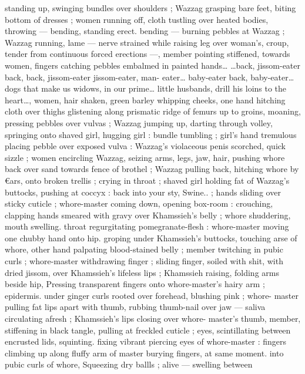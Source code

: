 standing up, swinging bundles over shoulders ; Wazzag grasping 
bare feet, biting bottom of dresses ; women running off, cloth 
tustling over heated bodies, throwing --- bending, standing erect. 
bending --- burning pebbles at Wazzag ; Wazzag running, lame --- 
nerve strained while raising leg over woman's, croup, tender from 
continuous forced erections ---, member pointing stiffened, towards 
women, fingers catching pebbles embalmed in painted hands{\ldots} 
{\gl}{\ldots}back, jissom-eater{\td} back, back, jissom-eater{\td} jissom-eater, man- 
eater{\ldots} baby-eater{\td} back, baby-eater{\ldots} dogs that make us widows, in 
our prime{\ldots} little husbands, drill his loins to the heart{\ldots}{\gr}, women, 
hair shaken, green barley whipping cheeks, one hand hitching cloth 
over thighs glistening along prismatic ridge of femurs up to groins, 
moaning, pressing pebbles over vulvas ; Wazzag jumping up, darting 
through volley, springing onto shaved girl, hugging girl : bundle 
tumbling ; girl's hand tremulous placing pebble over exposed vulva : 
Wazzag's violaceous penis scorched, quick sizzle ; women encircling 
Wazzag, seizing arms, legs, jaw, hair, pushing whore back over sand 
towards fence of brothel ; Wazzag pulling back, hitching whore by 
€ars, onto broken trellis ; crying in throat ; shaved girl holding fat of 
Wazzag's buttocks, pushing at coccyx : {\td} {\gl}{\td} back into your sty, 
Swine..{\gr} ; hands sliding over sticky cuticle ; whore-master coming 
down, opening box-room : crouching, clapping hands smeared with 
gravy over Khamssieh's belly ; whore shuddering, mouth swelling. 
throat regurgitating pomegranate-flesh : whore-master moving one 
chubby hand onto hip. groping under Khamssieh's buttocks, touching 
arse of whore, other hand palpating blood-stained belly ; member 
twitching in pubic curls ; whore-master withdrawing finger ; sliding 
finger, soiled with shit, with dried jissom, over Khamssieh's lifeless 
lips ; Khamssieh raising, folding arms beside hip, Pressing 
transparent fingers onto whore-master's hairy arm ; epidermis. 
under ginger curls rooted over forehead, blushing pink ; whore- 
master pulling fat lips apart with thumb, rubbing thumb-nail over jaw 
--- saliva circulating afresh ; Khamssieh's lips closing over whore- 
master's thumb, member, stiffening in black tangle, pulling at 
freckled cuticle ; eyes, scintillating between encrusted lids, squinting. 
fixing vibrant piercing eyes of whore-master : fingers climbing up 
along fluffy arm of master burying fingers, at same moment. into 
pubic curls of whore, Squeezing dry ballls ; alive --- swelling between 
